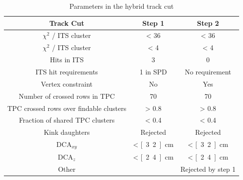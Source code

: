 \begin{table}
\caption{Parameters in the hybrid track cut}
\label{tab:hybrid}
\begin{tabular}{c | c | c}
Track Cut & Step 1 & Step 2 \\
\hline
$\chi^2$ / ITS cluster & < 36 & < 36 \\
$\chi^2$ / ITS cluster & < 4 & < 4 \\
Hits in ITS & 3 & 0 \\
ITS hit requirements & 1 in SPD & No requirement \\
Vertex constraint & No & Yes \\
Number of crossed rows in TPC  & 70 & 70 \\
TPC crossed rows over findable clusters & > 0.8 & > 0.8 \\
Fraction of shared TPC clusters & < 0.4 & < 0.4 \\
Kink daughters & Rejected & Rejected \\
$\mathrm{DCA}_{xy}$ & < \unit[3.2]{cm} & < \unit[3.2]{cm} \\
$\mathrm{DCA}_{z}$ & < \unit[2.4]{cm} & < \unit[2.4]{cm} \\
Other & & Rejected by step 1 \\
\end{tabular}
\end{table}









\FloatBarrier
